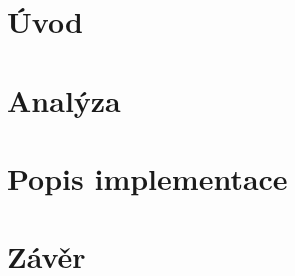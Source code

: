 \documentclass{article}
\begin{document}
\section{Úvod}
\section{Analýza}
\section{Popis implementace}
\section{Závěr}




%

\end{document}
